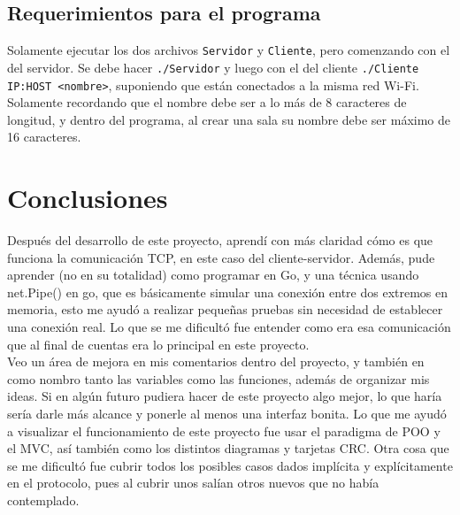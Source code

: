 \documentclass[12pt,a4paper]{article}
\begin{document}
\subsection*{Requerimientos para el programa}
Solamente ejecutar los dos archivos \texttt{Servidor} y \texttt{Cliente}, pero
comenzando con el del servidor. Se debe hacer \texttt{./Servidor} y luego con
el del cliente \texttt{./Cliente IP:HOST <nombre>}, suponiendo que están
conectados a la misma red Wi-Fi. Solamente recordando que el nombre debe ser a
lo más de 8 caracteres de longitud, y dentro del programa, al crear una sala
su nombre debe ser máximo de 16 caracteres.


\newpage
\section*{Conclusiones}
Después del desarrollo de este proyecto, aprendí con más claridad cómo es
que funciona la comunicación TCP, en este caso del cliente-servidor. Además,
pude aprender (no en su totalidad) como programar en Go, y una técnica usando
net.Pipe() en go, que es básicamente simular una conexión entre dos extremos en
memoria, esto me ayudó a realizar pequeñas pruebas sin necesidad de establecer
una conexión real. Lo que se me dificultó fue entender como era esa
comunicación que al final de cuentas era lo principal en este proyecto.\\

\noindent Veo un área de mejora en mis comentarios dentro del proyecto, y también en
como nombro tanto las variables como las funciones, además de organizar mis
ideas. Si en algún futuro pudiera hacer de este proyecto algo mejor, lo que
haría sería darle más alcance y ponerle al menos una interfaz bonita.
Lo que me ayudó a visualizar el funcionamiento de este proyecto fue usar el
paradigma de POO y el MVC, así también como los distintos diagramas y tarjetas
CRC. Otra cosa que se me dificultó fue cubrir todos los posibles casos dados
implícita y explícitamente en el protocolo, pues al cubrir unos salían otros
nuevos que no había contemplado.
\end{document}
